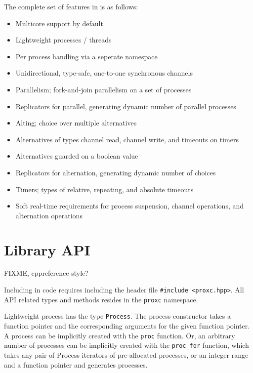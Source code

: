 The complete set of features in \Proxc{} is as follows:

\begin{itemize}[topsep=0em,itemsep=-1em,partopsep=0.5em,parsep=1em]
    \item Multicore support by default
    \item Lightweight processes / threads
    \item Per process handling via a seperate namespace
    \item Unidirectional, type\hyp{}safe, one\hyp{}to\hyp{}one synchronous channels
    \item Parallelism; fork\hyp{}and\hyp{}join parallelism on a set of processes
    \item Replicators for parallel, generating dynamic number of parallel processes
    \item Alting; choice over multiple alternatives
    \item Alternatives of types channel read, channel write, and timeouts on timers
    \item Alternatives guarded on a boolean value
    \item Replicators for alternation, generating dynamic number of choices
    \item Timers; types of relative, repeating, and absolute timeouts
    \item Soft real\hyp{}time requirements for process suspension, channel operations, and alternation operations
\end{itemize}


\section{Library API}
\label{sec:library_api}

FIXME, cppreference style?

Including \Proxc{} in code requires including the header file \lstinline[style={CustomC++}]|#include <proxc.hpp>|. All API related types and methods resides in the \lstinline[style={CustomC++}]|proxc| namespace. 

Lightweight process has the type \lstinline[style={CustomC++}]|Process|. The process constructor takes a function pointer and the corresponding arguments for the given function pointer. A process can be implicitly created with the \lstinline[style={CustomC++}]|proc| function. Or, an arbitrary number of processes can be implicitly created with the \lstinline[style={CustomC++}]|proc_for| function, which takes any pair of Process iterators of pre\hyp{}allocated processes, or an integer range and a function pointer and generates processes.

